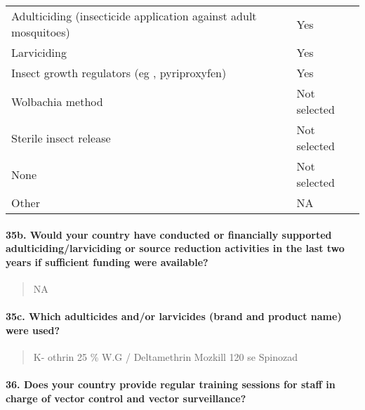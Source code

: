 \documentclass[
]{article}
\begin{document}
\begin{longtable}[]{@{}ll@{}}
\toprule
\endhead
Adulticiding (insecticide application against adult mosquitoes) & Yes \\
Larviciding & Yes \\
Insect growth regulators (eg , pyriproxyfen) & Yes \\
Wolbachia method & Not selected \\
Sterile insect release & Not selected \\
None & Not selected \\
Other & NA \\
\bottomrule
\end{longtable}

\hypertarget{b.-would-your-country-have-conducted-or-financially-supported-adulticidinglarviciding-or-source-reduction-activities-in-the-last-two-years-if-sufficient-funding-were-available}{%
\paragraph{35b. Would your country have conducted or financially
supported adulticiding/larviciding or source reduction activities in the
last two years if sufficient funding were
available?}\label{b.-would-your-country-have-conducted-or-financially-supported-adulticidinglarviciding-or-source-reduction-activities-in-the-last-two-years-if-sufficient-funding-were-available}}

\begin{quote}
NA
\end{quote}

\hypertarget{c.-which-adulticides-andor-larvicides-brand-and-product-name-were-used}{%
\paragraph{35c. Which adulticides and/or larvicides (brand and product
name) were
used?}\label{c.-which-adulticides-andor-larvicides-brand-and-product-name-were-used}}

\begin{quote}
K- othrin 25 \% W.G / Deltamethrin Mozkill 120 se Spinozad
\end{quote}

\hypertarget{does-your-country-provide-regular-training-sessions-for-staff-in-charge-of-vector-control-and-vector-surveillance}{%
\paragraph{36. Does your country provide regular training sessions for
staff in charge of vector control and vector
surveillance?}\label{does-your-country-provide-regular-training-sessions-for-staff-in-charge-of-vector-control-and-vector-surveillance}}
\end{document}
